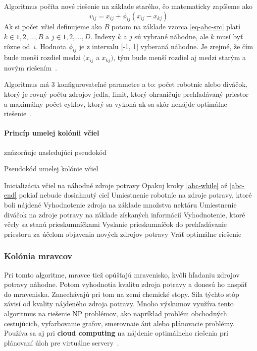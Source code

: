 \documentclass[a4paper,slovak,12pt,appendix]{article}
\begin{document}
Algoritmus počíta nové riešenie na základe starého, čo matematicky zapíšeme ako
\begin{equation}
  v_{ij} = x_{ij} + \phi_{ij} (x_{ij} - x_{kj})
  \label{eq-abc-src}
\end{equation}
Ak si počet včiel definujeme ako $B$ potom na základe vzorca \ref{eq-abc-src}
platí $k \in {1, 2, ..., B}$ a $j \in {1, 2, ..., D}$. Indexy $k$ a $j$ sú
vybrané náhodne, ale $k$ musí byť rôzne od $i$. Hodnota $\phi_{ij}$ je
z intervalu [-1, 1] vyberaná náhodne. Je zrejmé, že čím bude menší rozdiel
medzi $(x_{ij}$ a $x_{kj})$, tým bude menší rozdiel aj medzi starým a novým
riešením~\cite{Karaboga2007}.

Algoritmus má 3 konfigurovateľné parametre a to: počet robotníc alebo diváčok,
ktorý je rovný počtu zdrojov jedla, limit, ktorý ohraničuje prehľadávaný
priestor a maximálny počet cyklov, ktorý sa vykoná ak sa skôr nenájde
optimálne riešenie~\cite{Karaboga2007}.

\paragraph{Princíp umelej kolónii včiel} znázorňuje nasledujúci
pseudokód~\cite{Karaboga2007}
\begin{algorithm}[H]
  \caption{Pseudokód umelej kolónie včiel}
  \begin{algorithmic}[1]
    \State Inicializácia včiel na náhodné zdroje potravy
    \State Opakuj kroky \ref{abc-while} až \ref{abc-end} pokiaľ nebude dosiahnutý cieľ \label{abc-while}
    \State Umiestnenie robotníc na zdroje potravy, ktoré boli nájdené
    \State Vyhodnotenie zdroja na základe množstva nektáru
    \State Umiestnenie diváčok na zdroje potravy na základe získaných informácií
    \State Vyhodnotenie, ktoré včely sa stanú prieskumníčkami
    \State Vyslanie prieskumníčok do prehľadávanie priestoru za účelom objavenia nových zdrojov potravy \label{abc-end}
    \State Vráť optimálne riešenie
  \end{algorithmic}
\end{algorithm}


\subsubsection{Kolónia mravcov}
Pri tomto algoritme, mravce tiež opúšťajú mravenisko, kvôli hľadaniu zdrojov
potravy náhodne. Potom vyhodnotia kvalitu zdroja potravy a donesú ho naspäť do
mraveniska. Zanechávajú pri tom na zemi chemické stopy. Sila týchto stôp závisí
od kvality nájdeného zdroja potravy. Mnoho výskumov využíva tento algoritmus na
riešenie NP problémov, ako napríklad problém obchodných cestujúcich,
vyfarbovanie grafov, smerovnaie áut alebo plánovacie problémy. Používa sa aj pri
\textbf{cloud computing} na nájdenie optimálneho riešenia pri plánovaní úloh
pre virtuálne servery~\cite{Buhussain2016}.
\end{document}
